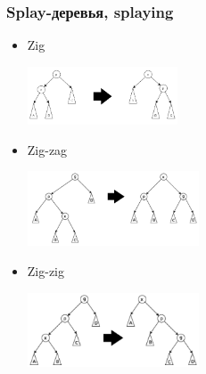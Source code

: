 \documentclass{../../slides-style}
\begin{document}
    \begin{frame}
        \frametitle{Splay-деревья, splaying}
        \begin{itemize}
            \item Zig
            \begin{center}
                \includegraphics[width=0.35\textwidth]{zig.png}
            \end{center}
            \item Zig-zag
            \begin{center}
                \includegraphics[width=0.4\textwidth]{zig-zag.png}
            \end{center}
            \item Zig-zig
            \begin{center}
                \includegraphics[width=0.4\textwidth]{zig-zig.png}
            \end{center}
        \end{itemize}
    \end{frame}
\end{document}
